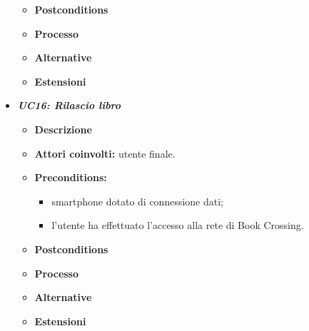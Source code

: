 \begin{itemize}
\begin{itemize}
		\item \textbf{Postconditions}
		\item \textbf{Processo}
		\item \textbf{Alternative}
		\item \textbf{Estensioni}
	\end{itemize}
	\item \textbf{\textit{UC16: Rilascio libro}}
	\begin{itemize}
		\item \textbf{Descrizione}
		\item \textbf{Attori coinvolti:} utente finale.
		\item \textbf{Preconditions:}
		\begin{itemize}
			\item smartphone dotato di connessione dati;
			\item l’utente ha effettuato l’accesso alla rete di Book Crossing.
		\end{itemize}
		\item \textbf{Postconditions}
		\item \textbf{Processo}
		\item \textbf{Alternative}
		\item \textbf{Estensioni}
	\end{itemize}
\end{itemize}